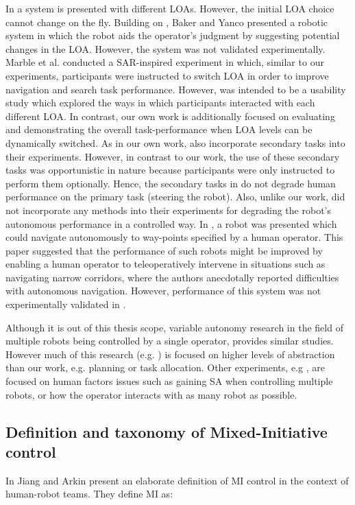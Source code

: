 \documentclass[a4paper,12pt,oneside,openright]{bhamthesis}
\begin{document}
In \citep{Goodrich2001} a system is presented with different LOAs. However, the initial LOA choice cannot change on the fly. Building on \citep{Bruemmer2002}, Baker and Yanco \citep{Baker2004b} presented a robotic system in which the robot aids the operator's judgment by suggesting potential changes in the LOA. However, the system was not validated experimentally. Marble et al. \citep{Marble2004} conducted a SAR-inspired experiment in which, similar to our experiments, participants were instructed to switch LOA in order to improve navigation and search task performance. However, \citep{Marble2004} was intended to be a usability study which explored the ways in which participants interacted with each different LOA. In contrast, our own work is additionally focused on evaluating and demonstrating the overall task-performance when LOA levels can be dynamically switched. As in our own work, \citep{Marble2004} also incorporate secondary tasks into their experiments. However, in contrast to our work, the use of these secondary tasks was opportunistic in nature because participants were only instructed to perform them optionally. Hence, the secondary tasks in \citep{Marble2004} do not degrade human performance on the primary task (steering the robot). Also, unlike our work, \citep{Marble2004} did not incorporate any methods into their experiments for degrading the robot's autonomous performance in a controlled way. In \citep{Ibanez-Guzman2004}, a robot was presented which could navigate autonomously to way-points specified by a human operator. This paper suggested that the performance of such robots might be improved by enabling a human operator to teleoperatively intervene in situations such as navigating narrow corridors, where the authors anecdotally reported difficulties with autonomous navigation. However, performance of this system was not experimentally validated in \citep{Ibanez-Guzman2004}.

Although it is out of this thesis scope, variable autonomy research in the field of multiple robots being controlled by a single operator, provides similar studies. However much of this research (e.g. \citep{Hardin2009,Goodrich2007b}) is focused on higher levels of abstraction than our work, e.g. planning or task allocation. Other experiments, e.g \citep{Riley2006, Valero-Gomez2011}, are focused on human factors issues such as gaining SA when controlling multiple robots, or how the operator interacts with as many robot as possible.


\subsection{Definition and taxonomy of Mixed-Initiative control}
\label{section:MI-taxonomy}
In \citep{Jiang2015} Jiang and Arkin present an elaborate definition of MI control in the context of human-robot teams. They define MI as:
\end{document}
